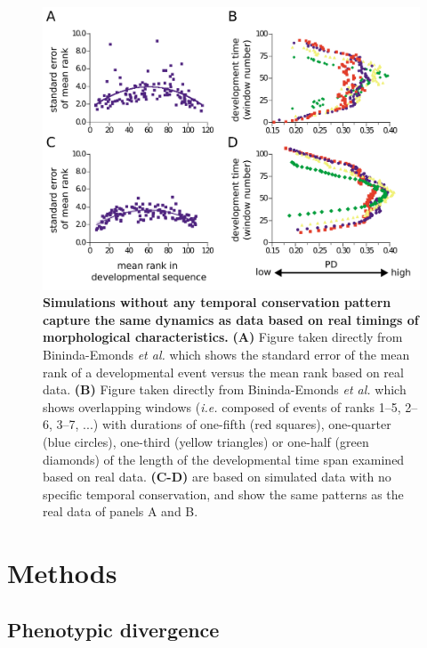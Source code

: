 \begin{figure} [H]
    \includegraphics[width=\linewidth]{ch.inverthourglass/imgs/inverting.png}
    \caption{\textbf{Simulations without any temporal conservation pattern capture the same dynamics as data based on real timings of morphological characteristics.} \textbf{(A)} Figure taken directly from Bininda-Emonds \textit{et al.}\cite{OlafRP2003} which shows the standard error of the mean rank of a developmental event versus the mean rank based on real data. \textbf{(B)} Figure taken directly from Bininda-Emonds \textit{et al.}\cite{OlafRP2003} which shows overlapping windows (\textit{i.e.} composed of events of ranks 1–5, 2–6, 3–7, ...) with durations of one-fifth (red squares), one-quarter (blue circles), one-third (yellow triangles) or one-half (green diamonds) of the length of the developmental time span examined based on real data. \textbf{(C-D)} are based on simulated data with no specific temporal conservation, and show the same patterns as the real data of panels A and B. }
    \label{fig:inverting_inversehourglass}
\end{figure}

\vspace*{\fill}

\newpage

\section{Methods}

\subsection{Phenotypic divergence}

